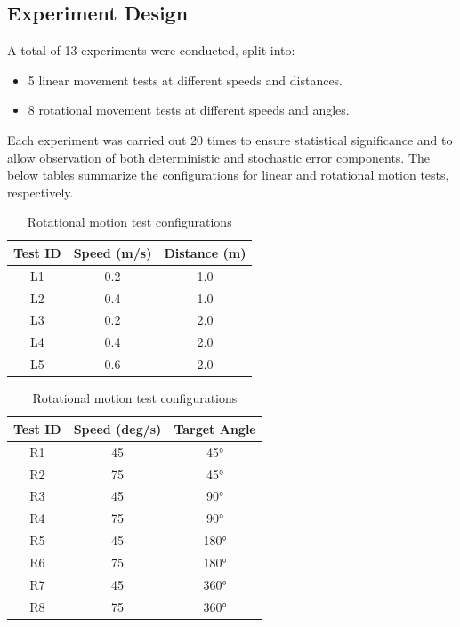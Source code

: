 \documentclass[a4paper, 12pt]{article}
\begin{document}
    \subsection{Experiment Design}
    A total of 13 experiments were conducted, split into:
    \begin{itemize}[noitemsep]
        \item 5 linear movement tests at different speeds and distances.
        \item 8 rotational movement tests at different speeds and angles.
    \end{itemize}

    Each experiment was carried out 20 times to ensure statistical significance and to allow observation of both deterministic and stochastic error components. The below tables summarize the configurations for linear and rotational motion tests, respectively.

    \begin{table}[H]
        \centering
        \begin{minipage}{0.48\linewidth}
            \centering
            \scriptsize
            \begin{tabular}{|c|c|c|}
            \hline
            \textbf{Test ID} & \textbf{Speed (m/s)} & \textbf{Distance (m)} \\
            \hline
            L1 & 0.2 & 1.0 \\
            L2 & 0.4 & 1.0 \\
            L3 & 0.2 & 2.0 \\
            L4 & 0.4 & 2.0 \\
            L5 & 0.6 & 2.0 \\
            \hline
            \end{tabular}
            \caption{Linear motion test configurations}
        \end{minipage}\hfill
        \begin{minipage}{0.48\linewidth}
            \centering
            \scriptsize
            \begin{tabular}{|c|c|c|}
            \hline
            \textbf{Test ID} & \textbf{Speed (deg/s)} & \textbf{Target Angle} \\
            \hline
            R1 & 45 & 45° \\
            R2 & 75 & 45° \\
            R3 & 45 & 90° \\
            R4 & 75 & 90° \\
            R5 & 45 & 180° \\
            R6 & 75 & 180° \\
            R7 & 45 & 360° \\
            R8 & 75 & 360° \\
            \hline
            \end{tabular}
            \caption{Rotational motion test configurations}
        \end{minipage}
    \end{table}
\end{document}
